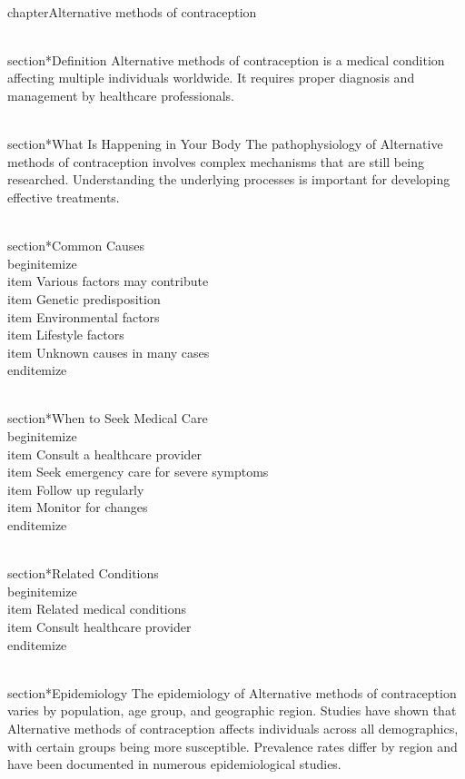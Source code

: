 
\\chapter{Alternative methods of contraception}

\\section*{Definition}
Alternative methods of contraception is a medical condition affecting multiple individuals worldwide. It requires proper diagnosis and management by healthcare professionals.

\\section*{What Is Happening in Your Body}
The pathophysiology of Alternative methods of contraception involves complex mechanisms that are still being researched. Understanding the underlying processes is important for developing effective treatments.

\\section*{Common Causes}
\\begin{itemize}
\\item Various factors may contribute\n  \\item Genetic predisposition\n  \\item Environmental factors\n  \\item Lifestyle factors\n  \\item Unknown causes in many cases
\\end{itemize}

\\section*{When to Seek Medical Care}
\\begin{itemize}
\\item Consult a healthcare provider\n  \\item Seek emergency care for severe symptoms\n  \\item Follow up regularly\n  \\item Monitor for changes
\\end{itemize}

\\section*{Related Conditions}
\\begin{itemize}
\\item Related medical conditions\n  \\item Consult healthcare provider
\\end{itemize}

\\section*{Epidemiology}
The epidemiology of Alternative methods of contraception varies by population, age group, and geographic region. Studies have shown that Alternative methods of contraception affects individuals across all demographics, with certain groups being more susceptible. Prevalence rates differ by region and have been documented in numerous epidemiological studies.

